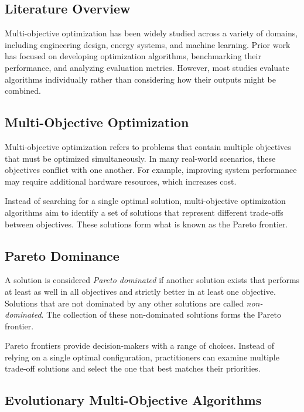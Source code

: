 \documentclass[sigconf,authorversion,nonacm]{acmart}
\begin{document}
\subsection{Literature Overview}

Multi-objective optimization has been widely studied across a variety of domains, 
including engineering design, energy systems, and machine learning. Prior work 
has focused on developing optimization algorithms, benchmarking their performance, 
and analyzing evaluation metrics. However, most studies evaluate algorithms 
individually rather than considering how their outputs might be combined.

\subsection{Multi-Objective Optimization}

Multi-objective optimization refers to problems that contain multiple 
objectives that must be optimized simultaneously. In many real-world 
scenarios, these objectives conflict with one another. For example, 
improving system performance may require additional hardware resources, 
which increases cost.

Instead of searching for a single optimal solution, multi-objective 
optimization algorithms aim to identify a set of solutions that represent 
different trade-offs between objectives. These solutions form what is 
known as the Pareto frontier.

\subsection{Pareto Dominance}

A solution is considered \textit{Pareto dominated} if another solution 
exists that performs at least as well in all objectives and strictly 
better in at least one objective. Solutions that are not dominated by 
any other solutions are called \textit{non-dominated}. The collection of 
these non-dominated solutions forms the Pareto frontier.

Pareto frontiers provide decision-makers with a range of choices. 
Instead of relying on a single optimal configuration, practitioners 
can examine multiple trade-off solutions and select the one that best 
matches their priorities.

\subsection{Evolutionary Multi-Objective Algorithms}
\end{document}
